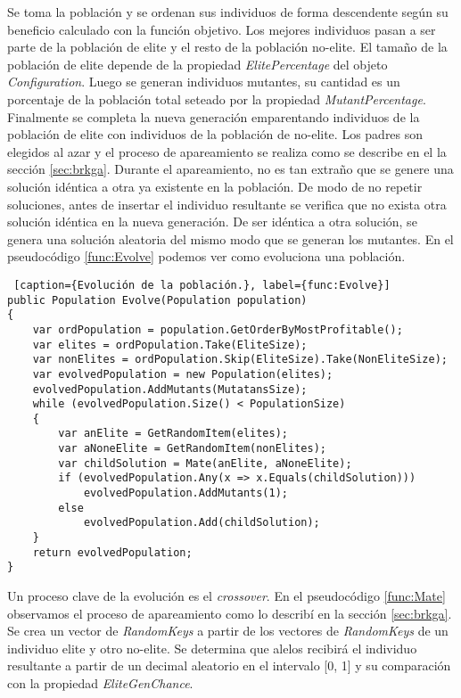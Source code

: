 Se toma la población y se ordenan sus individuos de forma descendente según su beneficio calculado con la función objetivo. Los mejores individuos pasan a ser parte de la población de elite y el resto de la población no-elite. El tamaño de la población de elite depende de la propiedad \textit{ElitePercentage} del objeto \textit{Configuration}. Luego se generan individuos mutantes, su cantidad es un porcentaje de la población total seteado por la propiedad \textit{MutantPercentage}. Finalmente se completa la nueva generación emparentando individuos de la población de elite con individuos de la población de no-elite. Los padres son elegidos al azar y el proceso de apareamiento se realiza como se describe en el la sección \ref{sec:brkga}. Durante el apareamiento, no es tan extraño que se genere una solución idéntica a otra ya existente en la población. De modo de no repetir soluciones, antes de insertar el individuo resultante se verifica que no exista otra solución idéntica en la nueva generación. De ser idéntica a otra solución, se genera una solución aleatoria del mismo modo que se generan los mutantes. En el pseudocódigo \ref{func:Evolve} podemos ver como evoluciona una población.

\bigskip

\begin{minipage}{\textwidth}
\begin{lstlisting} [caption={Evolución de la población.}, label={func:Evolve}]
public Population Evolve(Population population)
{
	var ordPopulation = population.GetOrderByMostProfitable();
	var elites = ordPopulation.Take(EliteSize);
	var nonElites = ordPopulation.Skip(EliteSize).Take(NonEliteSize);
	var evolvedPopulation = new Population(elites);
	evolvedPopulation.AddMutants(MutatansSize);
	while (evolvedPopulation.Size() < PopulationSize)
	{
		var anElite = GetRandomItem(elites);
		var aNoneElite = GetRandomItem(nonElites);
		var childSolution = Mate(anElite, aNoneElite);
		if (evolvedPopulation.Any(x => x.Equals(childSolution)))
			evolvedPopulation.AddMutants(1);
		else
			evolvedPopulation.Add(childSolution);
	}
	return evolvedPopulation;
}
\end{lstlisting}
\end{minipage}

\bigskip

Un proceso clave de la evolución es el \textit{crossover}. En el pseudocódigo \ref{func:Mate} observamos el proceso de apareamiento como lo describí en la sección \ref{sec:brkga}. Se crea un vector de \textit{RandomKeys} a partir de los vectores de \textit{RandomKeys} de un individuo elite y otro no-elite. Se determina que alelos recibirá el individuo resultante a partir de un decimal aleatorio en el intervalo [0, 1] y su comparación con la propiedad \textit{EliteGenChance}.

